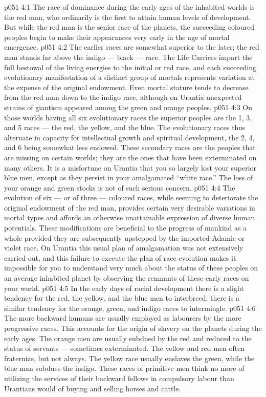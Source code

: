 \vs p051 4:1 The race of dominance during the early ages of the inhabited worlds is the red man, who ordinarily is the first to attain human levels of development. But while the red man is the senior race of the planets, the succeeding coloured peoples begin to make their appearances very early in the age of mortal emergence.
\vs p051 4:2 The earlier races are somewhat superior to the later; the red man stands far above the indigo --- black --- race. The Life Carriers impart the full bestowal of the living energies to the initial or red race, and each succeeding evolutionary manifestation of a distinct group of mortals represents variation at the expense of the original endowment. Even mortal stature tends to decrease from the red man down to the indigo race, although on Urantia unexpected strains of giantism appeared among the green and orange peoples.
\vs p051 4:3 On those worlds having all six evolutionary races the superior peoples are the 1, 3, and 5 races --- the red, the yellow, and the blue. The evolutionary races thus alternate in capacity for intellectual growth and spiritual development, the 2, 4, and 6 being somewhat less endowed. These secondary races are the peoples that are missing on certain worlds; they are the ones that have been exterminated on many others. It is a misfortune on Urantia that you so largely lost your superior blue men, except as they persist in your amalgamated “white race.” The loss of your orange and green stocks is not of such serious concern.
\vs p051 4:4 The evolution of six --- or of three --- coloured races, while seeming to deteriorate the original endowment of the red man, provides certain very desirable variations in mortal types and affords an otherwise unattainable expression of diverse human potentials. These modifications are beneficial to the progress of mankind as a whole provided they are subsequently upstepped by the imported Adamic or violet race. On Urantia this usual plan of amalgamation was not extensively carried out, and this failure to execute the plan of race evolution makes it impossible for you to understand very much about the status of these peoples on an average inhabited planet by observing the remnants of these early races on your world.
\vs p051 4:5 \pc In the early days of racial development there is a slight tendency for the red, the yellow, and the blue men to interbreed; there is a similar tendency for the orange, green, and indigo races to intermingle.
\vs p051 4:6 The more backward humans are usually employed as labourers by the more progressive races. This accounts for the origin of slavery on the planets during the early ages. The orange men are usually subdued by the red and reduced to the status of servants --- sometimes exterminated. The yellow and red men often fraternize, but not always. The yellow race usually enslaves the green, while the blue man subdues the indigo. These races of primitive men think no more of utilizing the services of their backward fellows in compulsory labour than Urantians would of buying and selling horses and cattle.
